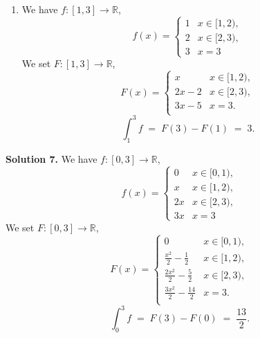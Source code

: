 \documentclass[10pt]{article}
\begin{document}
\begin{enumerate}
                \item We have $f\colon [1, 3] \to \mathbb{R}$,
                \[
                        f(x) =
                        \begin{cases}
                                1       &       x \in [1, 2), \\
                                2       &       x \in [2, 3), \\
                                3       &       x = 3
                        \end{cases}
                \]
                We set $F\colon [1, 3] \to \mathbb{R}$,
                \[
                        F(x) =
                        \begin{cases}
                                x                &       x \in [1, 2), \\
                                2x - 2           &       x \in [2, 3), \\
                                3x - 5           &       x = 3. \\
                        \end{cases}
                \]
                \[\int_{1}^{3} f \;=\; F(3) - F(1) \;=\; 3.\]
        \end{enumerate}

        \textbf{Solution 7.}
                We have $f\colon [0, 3] \to \mathbb{R}$,
                \[
                        f(x) =
                        \begin{cases}
                                0       &       x \in [0, 1), \\
                                x       &       x \in [1, 2), \\
                                2x      &       x \in [2, 3), \\
                                3x      &       x = 3
                        \end{cases}
                \]
                We set $F\colon [0, 3] \to \mathbb{R}$,
                \[
                        F(x) =
                        \begin{cases}
                                0                                       &       x \in [0, 1), \\
                                \frac{ x^2}{2} - \frac{1}{2}            &       x \in [1, 2), \\
                                \frac{2x^2}{2} - \frac{5}{2}            &       x \in [2, 3), \\
                                \frac{3x^2}{2} - \frac{14}{2}           &       x = 3. \\
                        \end{cases}
                \]
                \[\int_{0}^{3} f \;=\; F(3) - F(0) \;=\; \frac{13}{2}.\]
\end{document}
